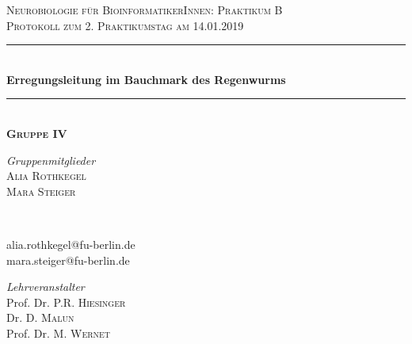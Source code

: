 \documentclass[11pt]{article}
\begin{document}
\begin{titlepage} %
	\newcommand{\HRule}{\rule{\linewidth}{0.5mm}} %
	
	\center %
	\vspace*{0.75cm}

	
	\textsc{\Large Neurobiologie für BioinformatikerInnen: Praktikum B}\\[0.65cm] %
	
	\textsc{\large Protokoll zum 2. Praktikumstag am 14.01.2019}\\[0.65cm] %

	\HRule\\[0.5cm]
	
	{\huge\bfseries Erregungsleitung im Bauchmark des Regenwurms}\\[0.3cm] %
	
	\HRule\\[0.75cm]
	\textsc{\Large\bfseries Gruppe IV}
	\\[0.8cm]
	
\vfill

	\begin{minipage}{0.45\textwidth}
		\begin{flushleft}
			\large
			\textit{Gruppenmitglieder}\\
			\textsc{Alia Rothkegel}\\
			\textsc{Mara Steiger}
		\end{flushleft}
	\end{minipage}
	~
	\begin{minipage}{0.45\textwidth}
		\begin{flushright}
			\large \vspace{16pt}
			alia.rothkegel@fu-berlin.de\\
			mara.steiger@fu-berlin.de 
		\end{flushright}
	\end{minipage}
	
\vfill

	\begin{minipage}{0.45\textwidth}
		\begin{flushleft}
			\large
			\textit{Lehrveranstalter}\\
			Prof. Dr. P.R. \textsc{Hiesinger}\\ 
			Dr. D. \textsc{Malun}\\ 
			Prof. Dr. M. \textsc{Wernet}
		\end{flushleft}
	\end{minipage}
	~
		\begin{minipage}{0.45\textwidth}
		\begin{flushright}
			

\end{flushright}
\end{minipage}
\end{titlepage}
\end{document}
